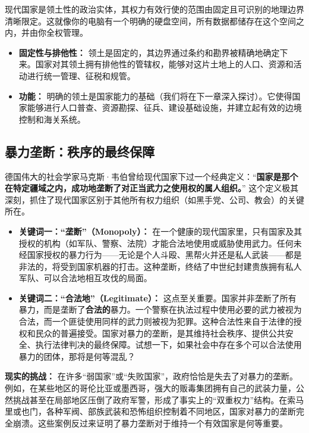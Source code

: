 现代国家是领土性的政治实体，其权力有效行使的范围由固定且可识别的地理边界清晰限定。这就像你的电脑有一个明确的硬盘空间，所有数据都储存在这个空间之内，并由你全权管理。

\begin{itemize}
    \item \textbf{固定性与排他性：} 领土是固定的，其边界通过条约和勘界被精确地确定下来。国家对其领土拥有排他性的管辖权，能够对这片土地上的人口、资源和活动进行统一管理、征税和规管。
    \item \textbf{功能：} 明确的领土是国家能力的基础（我们将在下一章深入探讨）。它使得国家能够进行人口普查、资源勘探、征兵、建设基础设施，并建立起有效的边境控制和海关系统。
\end{itemize}

\subsection{暴力垄断：秩序的最终保障}

德国伟大的社会学家马克斯·韦伯曾给现代国家下过一个经典定义：“\textbf{国家是那个在特定疆域之内，成功地垄断了对正当武力之使用权的属人组织。}” 这个定义极其深刻，抓住了现代国家区别于其他所有权力组织（如黑手党、公司、教会）的关键所在。

\begin{itemize}
    \item \textbf{关键词一：“垄断”（Monopoly）：} 在一个健康的现代国家里，只有国家及其授权的机构（如军队、警察、法院）才能合法地使用或威胁使用武力。任何未经国家授权的暴力行为——无论是个人斗殴、黑帮火并还是私人武装——都是非法的，将受到国家机器的打击。这种垄断，终结了中世纪封建贵族拥有私人军队、可以合法地相互攻伐的局面。
    \item \textbf{关键词二：“合法地”（Legitimate）：} 这点至关重要。国家并非垄断了所有暴力，而是垄断了\textbf{合法的}暴力。一个警察在执法过程中使用必要的武力被视为合法，而一个匪徒使用同样的武力则被视为犯罪。这种合法性来自于法律的授权和民众的普遍接受。国家对暴力的垄断，是其维持社会秩序、提供公共安全、执行法律判决的最终保障。试想一下，如果社会中存在多个可以合法使用暴力的团体，那将是何等混乱？
\end{itemize}

\textbf{现实的挑战：} 在许多“弱国家”或“失败国家”，政府恰恰是失去了对暴力的垄断。例如，在某些地区的哥伦比亚或墨西哥，强大的贩毒集团拥有自己的武装力量，公然挑战甚至在局部地区压倒了政府军警，形成了事实上的“双重权力”结构。在索马里或也门，各种军阀、部族武装和恐怖组织控制着不同地区，国家对暴力的垄断完全崩溃。这些案例反过来证明了暴力垄断对于维持一个有效国家是何等重要。

